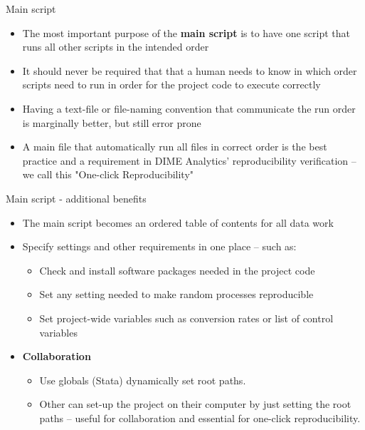 \documentclass[aspectratio=169]{beamer}
\begin{document}
\begin{frame}{Main script}
	
	\begin{itemize}	
       	\item The most important purpose of the \textbf{main script} is to have one script that
       	runs all other scripts in the intended order
       	\item It should never be required that that a human needs to know in which order scripts need to run in order for the project code to execute correctly
       	\item Having a text-file or file-naming convention that communicate the run order is marginally better, but still error prone
       	\item A main file that automatically run all files in correct order is the best practice and a requirement in DIME Analytics' reproducibility verification -- we call this "One-click Reproducibility"
    \end{itemize}
\end{frame}

\begin{frame}{Main script - additional benefits}

	\begin{itemize}
		
		\vspace{.2cm}
		\item The main script becomes an ordered table of contents for all data work 
		\vspace{.25cm}
  	
		\item Specify settings and other requirements in one place -- such as:
		\begin{itemize}
			\item Check and install software packages needed in the project code
			\item Set any setting needed to make random processes reproducible
			\item Set project-wide variables such as conversion rates or list of control variables
		\end{itemize}	

        \vspace{.25cm}

        \item \textbf{Collaboration} 
        \begin{itemize}
			\item Use globals (Stata) dynamically set root paths.
            \item Other can set-up the project on their computer by just setting the root paths -- useful for collaboration and essential for one-click reproducibility.
		\end{itemize}	

	\end{itemize}
\end{frame}
\end{document}
